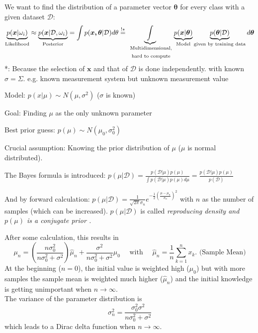   We want to find the distribution of a parameter vector $\bm{\theta}$ for every class with a given dataset $\mathcal{D}$:
  $$\underbrace{p(\bm x |\omega_i)}_{\text{Likelihood}}\approx \underbrace{p(\bm{x}|\mathcal{D},\omega_i)}_{\text{Posterior}} = \int{p(\bm{x,\theta}|\mathcal{D}) d \theta}\overset{!*}{=}
  \underbrace{\int}_{\text{
  	\parbox{2.3cm}{\centering 
  		Multidimensional, hard to compute}}  
	}
  \underbrace{p(\bm{x}|\bm{\theta})}_{\text{Model}} 
  \underbrace{p(\bm{\theta}|\mathcal{D})}_{\text{given by training data}} d\bm{\theta}$$
 *: Because the selection of $\bm{x}$ and that of $\mathcal{D}$ is done independently.
  with known $\sigma=\Sigma$. e.g. known measurement system but unknown measurement value\\
  \begin{aufzaehlung}
    \item Model: $p(x|\mu) \sim N(\mu, \sigma^2)$ ($\sigma$ is known)
    \item Goal: Finding $\mu$ as the only unknown parameter
    \item Best prior guess: $p(\mu) \sim N(\mu_0, \sigma_0^2)$
    \item Crucial assumption: Knowing the prior distribution of $\mu$ ($\mu$ is normal distributed).
    \item The Bayes formula is introduced: 
      $p(\mu|\mathcal{D}) = \frac{p(\mathcal{D}|\mu) p(\mu)}{\int p(\mathcal{D}|\mu) p(\mu) d\mu} = \frac{p(\mathcal{D}|\mu) p(\mu)}{p(\mathcal{D})}$
    \item And by forward calculation: 
      $p(\mu|\mathcal{D}) = \frac{1}{\sqrt{2\pi} \sigma_n} e^{-\frac12 (\frac{\mu-\mu_n}{\sigma_n})^2}$
      with $n$ as the number of samples (which can be increased). 
      $p(\mu|\mathcal{D})$ is called \em reproducing density \em and $p(\mu)$ is a \em conjugate prior \em.
    \item After some calculation, this results in
      $$\mu_n = (\frac{n\sigma_0^2}{n\sigma_0^2 + \sigma^2})\hat{\mu}_n + 
      \frac{\sigma^2}{n\sigma_0^2 + \sigma^2} \mu_0 \quad \text{ with } \quad
      \hat{\mu}_n = \frac1n \sum\limits_{k=1}^{n}x_k. \text{ (Sample Mean)}$$
      At the beginning ($n=0$), the initial value is weighted high ($\mu_0$) but with more samples
      the sample mean is weighted much higher ($\hat{\mu}_n$) and the initial knowledge is getting 
      unimportant when $n \rightarrow \infty$.\\
      The variance of the parameter distribution is
      $$\sigma_n^2 = \frac{\sigma_0^2 \sigma^2}{n\sigma_0^2 + \sigma^2}$$
      which leads to a Dirac delta function when $n \rightarrow \infty$.
  \end{aufzaehlung}
  

